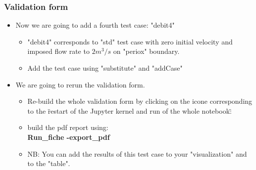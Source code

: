 \documentclass[10pt, hyperref={unicode=true,pdfusetitle, bookmarks=true,bookmarksnumbered=false,bookmarksopen=false, breaklinks=false,pdfborder={0 0l 1},backref=true,colorlinks=true,linkcolor=darkblue,pageanchor}]{beamer}
\begin{document}
\begin{frame}
\frametitle{Validation form}
\begin{block}{}

\begin{itemize}
\item Now we are going to add a fourth test case: "debit4"
    \begin{itemize}
    \item [$\circ$] "debit4" corresponds to "std" test case with zero initial velocity and imposed flow rate to $2 m^3/s$ on "periox" boundary.
    \item [$\circ$] Add the test case using "substitute" and "addCase"
    \end{itemize}

\item We are going to rerun the validation form.
    \begin{itemize}
    \item [$\circ$] Re-build the whole validation form by clicking on the icone corresponding to the \"restart of the Jupyter kernel and run of the whole notebook\":

    \item [$\circ$] build the pdf report using: \\

    \textbf{Run\_fiche -export\_pdf}
    \item [$\circ$] NB: You can add the results of this test case to your "visualization" and to the "table".
    \end{itemize}

\end{itemize}

\end{block}
\end{frame}
\end{document}
